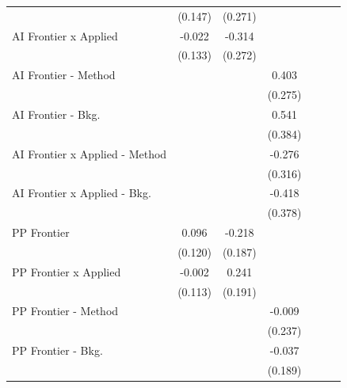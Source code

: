 \begin{tabular}{lcccccc}
                                  & (0.147)   & (0.271) &              &        &        &   \\   
   AI Frontier x Applied          & -0.022    & -0.314  &              &        &        &   \\   
                                  & (0.133)   & (0.272) &              &        &        &   \\   
   AI Frontier - Method           &           &         & 0.403        &        &        &   \\   
                                  &           &         & (0.275)      &        &        &   \\   
   AI Frontier - Bkg.             &           &         & 0.541        &        &        &   \\   
                                  &           &         & (0.384)      &        &        &   \\   
   AI Frontier x Applied - Method &           &         & -0.276       &        &        &   \\   
                                  &           &         & (0.316)      &        &        &   \\   
   AI Frontier x Applied - Bkg.   &           &         & -0.418       &        &        &   \\   
                                  &           &         & (0.378)      &        &        &   \\   
   PP Frontier                    & 0.096     & -0.218  &              &        &        &   \\   
                                  & (0.120)   & (0.187) &              &        &        &   \\   
   PP Frontier x Applied          & -0.002    & 0.241   &              &        &        &   \\   
                                  & (0.113)   & (0.191) &              &        &        &   \\   
   PP Frontier - Method           &           &         & -0.009       &        &        &   \\   
                                  &           &         & (0.237)      &        &        &   \\   
   PP Frontier - Bkg.             &           &         & -0.037       &        &        &   \\   
                                  &           &         & (0.189)      &        &        &   \\   

\end{tabular}
